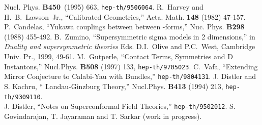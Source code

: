 \documentclass[a4paper,12pt]{article}
\begin{document}
\begin{thebibliography}{99}
Nucl. Phys. {\bf B450}\ (1995) 663, {\tt hep-th/9506064}.
 R.~Harvey and H.~B.~Lawson~Jr., ``Calibrated
Geometries,'' Acta. Math. {\bf 148} (1982) 47-157.
 P.~Candelas, ``Yukawa couplings between between
\coordHE{}-forms,'' Nuc. Phys. {\bf B298} (1988) 455-492.
B.~Zumino, ``Supersymmetric sigma models in 2 dimensions,''
in {\it Duality and supersymmetric theories}
Eds. D.I.~Olive and P.C.~West,  Cambridge Univ. Pr., 1999, 49-61.
M.~Gutperle, ``Contact Terms, Symmetries and D Instantons,'' 
Nucl.Phys. {\bf B508} (1997) 133, {\tt hep-th/9705023}.
 C.~Vafa, ``Extending Mirror Conjecture to
Calabi-Yau with Bundles,'' {\tt hep-th/9804131}. 
 J. Distler and S. Kachru,  ``\coordHE{} Landau-Ginzburg
Theory,'' Nucl.Phys. {\bf B413} (1994) 213, {\tt hep-th/9309110}.\\
J. Distler, ``Notes on \coordHE{} Superconformal Field Theories,''
{\tt hep-th/9502012}.
 S. Govindarajan, T. Jayaraman and T. Sarkar (work in
progress).
\end{thebibliography}
\end{document}
